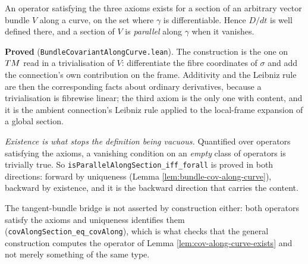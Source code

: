 \begin{lemma}
  \label{lem:bundle-cov-along-curve-exists}
  \leanok
  An operator satisfying the three axioms exists for a section of an arbitrary
  vector bundle $V$ along a curve, on the set where $\gamma$ is differentiable.
  Hence $D/dt$ is well defined there, and a section of $V$ is \emph{parallel}
  along $\gamma$ when it vanishes.

  \textbf{Proved} (\texttt{BundleCovariantAlongCurve.lean}). The construction is
  the one on $TM$ read in a trivialisation of $V$: differentiate the fibre
  coordinates of $\sigma$ and add the connection's own contribution on the
  frame. Additivity and the Leibniz rule are then the corresponding facts about
  ordinary derivatives, because a trivialisation is fibrewise linear; the third
  axiom is the only one with content, and it is the ambient connection's Leibniz
  rule applied to the local-frame expansion of a global section.

  \emph{Existence is what stops the definition being vacuous.} Quantified over
  operators satisfying the axioms, a vanishing condition on an \emph{empty}
  class of operators is trivially true. So
  \texttt{isParallelAlongSection\_iff\_forall} is proved in both directions:
  forward by uniqueness (Lemma \ref{lem:bundle-cov-along-curve}), backward by
  existence, and it is the backward direction that carries the content.

  The tangent-bundle bridge is not asserted by construction either: both
  operators satisfy the axioms and uniqueness identifies them
  (\texttt{covAlongSection\_eq\_covAlong}), which is what checks that the
  general construction computes the operator of Lemma
  \ref{lem:cov-along-curve-exists} and not merely something of the same type.
\end{lemma}

